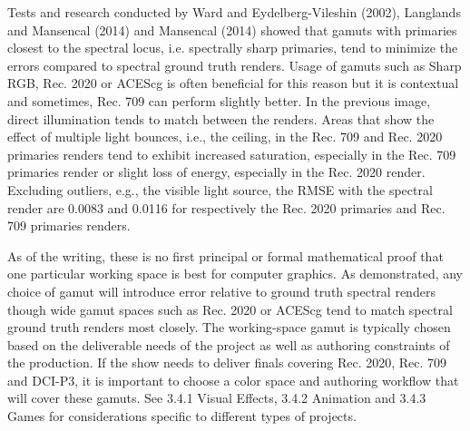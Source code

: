 Tests and research conducted by Ward and Eydelberg-Vileshin (2002), Langlands and Mansencal (2014) and Mansencal (2014) showed that gamuts with primaries closest to the spectral locus, i.e. spectrally sharp primaries, tend to minimize the errors compared to spectral ground truth renders. 
Usage of gamuts such as Sharp RGB, Rec. 2020 or ACEScg is often beneficial for this reason but it is contextual and sometimes, Rec. 709 can perform slightly better. In the previous image, direct illumination tends to match between the renders. Areas that show the effect of multiple light bounces, i.e., the ceiling, in the Rec. 709 and Rec. 2020 primaries renders tend to exhibit increased saturation, especially in the Rec. 709 primaries render or slight loss of energy, especially in the Rec. 2020 render. Excluding outliers, e.g., the visible light source, the RMSE with the spectral render are 0.0083 and 0.0116 for respectively the Rec. 2020 primaries and Rec. 709 primaries renders.

As of the writing, these is no first principal or formal mathematical proof that one particular working space is best for computer graphics. As demonstrated, any choice of gamut will introduce error relative to ground truth spectral renders though wide gamut spaces such as Rec. 2020 or ACEScg tend to match spectral ground truth renders most closely. The working-space gamut is typically chosen based on the deliverable needs of the project as well as authoring constraints of the production. If the show needs to deliver finals covering Rec. 2020, Rec. 709 and DCI-P3, it is important to choose a color space and authoring workflow that will cover these gamuts. See 3.4.1 Visual Effects, 3.4.2 Animation and 3.4.3 Games for considerations specific to different types of projects.


